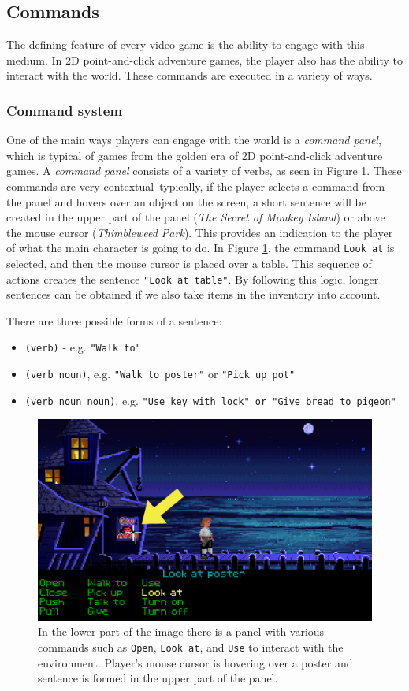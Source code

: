 \subsection{Commands}
The defining feature of every video game is the ability to engage with this medium. In 2D point-and-click adventure games, the player also has the ability to interact with the world. These commands are executed in a variety of ways.

\subsubsection{Command system}
One of the main ways players can engage with the world is a \textit{command panel}, which is typical of games from the golden era of 2D point-and-click adventure games. A \textit{command panel} consists of a variety of verbs, as seen in Figure \ref{fig:C-TSoMI}. These commands are very contextual--typically, if the player selects a command from the panel and hovers over an object on the screen, a short sentence will be created in the upper part of the panel (\textit{The Secret of Monkey Island}) or above the mouse cursor (\textit{Thimbleweed Park}). This provides an indication to the player of what the main character is going to do. In Figure \ref{fig:C-TSoMI}, the command \texttt{Look at} is selected, and then the mouse cursor is placed over a table. This sequence of actions creates the sentence \texttt{"Look at table"}. By following this logic, longer sentences can be obtained if we also take items in the inventory into account.

There are three possible forms of a sentence:
\begin{itemize}
    \item \verb|(verb)| - e.g. \texttt{"Walk to"}
    \item \verb|(verb noun)|, e.g. \texttt{"Walk to poster"} or \texttt{"Pick up pot"}
    \item \verb|(verb noun noun)|, e.g. \texttt{\texttt{"Use key with lock"} or "Give bread to pigeon"}
\end{itemize}
 
\begin{figure}[H]
\centering
\includegraphics[width=.8\linewidth]{img/C-TSoMI.png}
\caption{In the lower part of the image there is a panel with various commands such as \texttt{Open}, \texttt{Look at}, and \texttt{Use} to interact with the environment. Player's mouse cursor is hovering over a poster and sentence is formed in the upper part of the panel.}
\label{fig:C-TSoMI}
\end{figure}

